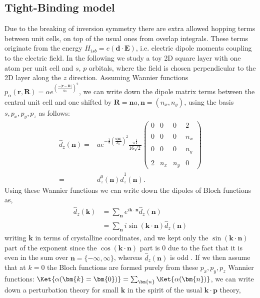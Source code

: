 \subsection{Tight-Binding model}
Due to the breaking of inversion symmetry there are extra allowed hopping terms between unit cells, on top of the usual ones from overlap integrals. These terms originate from the energy $H_{isb} = e (\bm{d}\cdot \bm{E})$, i.e. electric dipole moments coupling to the electric field. In the following we study a toy 2D square layer with one atom per unit cell and $s$, $p$ orbitals, where the field is chosen perpendicular to the 2D layer along the $z$ direction. Assuming Wannier functions $p_\alpha(\bm{r},\bm{R}) = \alpha e^{\left(\frac{-|\bm{r}-\bm{R}|}{a_0}\right)^2}$, we can write down the dipole matrix terms between the central unit cell and one shifted by $\bm{R}=\bm{n}a, \bm{n}=(n_x,n_y)$, using the basis $s, p_x, p_y, p_z$ as follows:
\begin{align}
	\label{eq:dipole}
	\hat{d}_z(\bm{n}) =& ae^{-\frac{1}{2}\left(\frac{a|\bm{n}|}{a_0}\right)^2}\frac{\pi^{\frac{3}{2}}}{16\sqrt{2}}\left(\begin{matrix}0&0&0&2\\\\0&0&0&n_x\\\\0&0&0&n_y\\\\2&n_x&n_y&0\end{matrix}\right)\\
	=&d_z^0(\bm{n})\hat{d}^1_z(\bm{n}).
\end{align}
Using these Wannier functions we can write down the dipoles of Bloch functions as,
\begin{align}
	\hat{d}_z(\bm{k}) &= \sum_{\bm{n}} e^{i \bm{k}\cdot \bm{n}}\hat{d}_z(\bm{n})\\
	&=\sum_{\bm{n}}i \sin(\bm{k}\cdot\bm{n}) \hat{d}_z(\bm{n})
\end{align}
writing $\bm{k}$ in terms of crystalline coordinates, and we kept only the $\sin(\bm{k}\cdot\bm{n})$ part of the exponent since the $\cos(\bm{k}\cdot\bm{n})$ part is $0$ due to the fact that it is even in the sum over $\bm{n} = \{-\infty, \infty\}$, whereas $\hat{d}_z(\bm{n})$ is odd . If we then assume that at $k=0$ the Bloch functions are formed purely from these $p_x,p_y,p_z$ Wannier functions: $\Ket{\alpha(\bm{k}=\bm{0})} = \sum_{\bm{n}} \Ket{\alpha(\bm{n})}$, we can write down a perturbation theory for small $\bm{k}$ in the spirit of the usual $\bm{k}\cdot\bm{p}$ theory,

